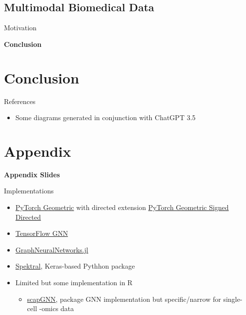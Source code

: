 \documentclass{beamer}
\begin{document}
\subsection{Multimodal Biomedical Data}

\begin{frame}{Motivation}
\end{frame}



\begin{frame}{}
    \bf{\LARGE Conclusion}    
\end{frame}

\section*{Conclusion}



\begin{frame}[allowframebreaks]{References}
    \begin{itemize}
    \item Some diagrams generated in conjunction with ChatGPT 3.5
    \end{itemize}
    \printbibliography 
\end{frame}



\section*{Appendix}

\begin{frame}{}
\bf{\LARGE Appendix Slides}    
\end{frame}

\begin{frame}{Implementations}
    \begin{itemize}
        \item \href{https://pytorch-geometric.readthedocs.io/en/latest/}{PyTorch Geometric} with directed extension \href{https://github.com/SherylHYX/pytorch_geometric_signed_directed}{PyTorch Geometric Signed Directed}
        \item \href{https://github.com/tensorflow/gnn}{TensorFlow GNN} \cite{ferludin_tf-gnn_2023}
        \item \href{https://carlolucibello.github.io/GraphNeuralNetworks.jl/dev/}{GraphNeuralNetworks.jl}
        \item \href{https://graphneural.network/}{Spektral}, Keras-based Pythhon package 
        \item Limited but some implementation in R 
        \begin{itemize}
            \item \href{https://cran.r-project.org/web/packages/scapGNN/vignettes/vignette.html}{scapGNN}, package GNN implementation but specific/narrow for single-cell -omics data 
        \end{itemize}
    \end{itemize}
\end{frame}
\end{document}
